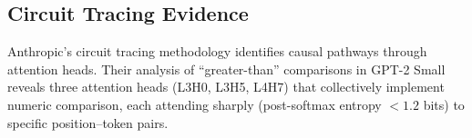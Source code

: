 \subsection{Circuit Tracing Evidence}











Anthropic's circuit tracing methodology identifies causal pathways through attention heads. Their analysis of ``greater-than'' comparisons in GPT-2 Small reveals three attention heads (L3H0, L3H5, L4H7) that collectively implement numeric comparison, each attending sharply (post-softmax entropy $< 1.2$ bits) to specific position--token pairs.











